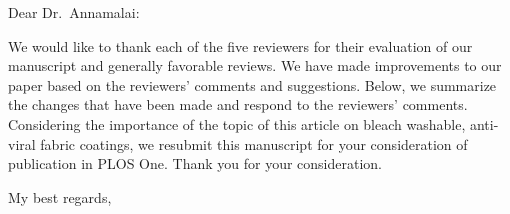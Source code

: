 \documentclass[12pt]{letter}
\date{\today}
\begin{document}
\begin{letter}{}

\opening{Dear Dr.~Annamalai:}

We would like to thank each of the five reviewers for their evaluation of our manuscript and generally favorable reviews.  
We have made improvements to our paper based on the reviewers' comments and suggestions.
Below, we summarize the changes that have been made and respond to the reviewers' comments.
Considering the importance of the topic of this
article on 
bleach washable, anti-viral fabric coatings,
we resubmit this manuscript for your consideration of publication in PLOS One.
Thank you for your consideration.

\closing{My best regards,}




\end{letter}







\end{document}
